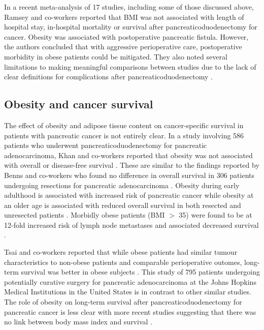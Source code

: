 In a recent meta-analysis of 17 studies, including some of those discussed above, Ramsey and co-workers reported that BMI was not associated with length of hospital stay, in-hospital mortality or survival after pancreaticoduodenectomy for cancer. 
Obesity was associated with postoperative pancreatic fistula. 
However, the authors concluded that with aggressive perioperative care, postoperative morbidity in obese patients could be mitigated. 
They also noted several limitations to making meaningful comparisons between studies due to the lack of clear definitions for complications after pancreaticoduodenectomy \parencite{ramsey_body_2011}.

\subsection{Obesity and cancer survival}

The effect of obesity and adipose tissue content on cancer-specific survival in patients with pancreatic cancer is not entirely clear. 
In a study involving 586 patients who underwent pancreaticoduodenectomy for pancreatic adenocarcinoma, Khan and co-workers reported that obesity was not associated with overall or disease-free survival \parencite{khan_does_2010}. 
These are similar to the findings reported by Benns and co-workers who found no difference in overall survival in 306 patients undergoing resections for pancreatic adenocarcinoma \parencite{benns_impact_2009}. 
Obesity during early adulthood is associated with increased risk of pancreatic cancer while obesity at an older age is associated with reduced overall survival in both resected and unresected patients \parencite{li_body_2009}. 
Morbidly obese patients (BMI $>$ 35) were found to be at 12-fold increased risk of lymph node metastases and associated decreased survival \parencite{fleming_influence_2009}.

Tsai and co-workers reported that while obese patients had similar tumour characteristics to non-obese patients and comparable perioperative outomes, long-term survival was better in obese subjects \parencite{tsai_impact_2010}. 
This study of 795 patients undergoing potentially curative surgery for pancreatic adenocarcinoma at the Johns Hopkins Medical Institutions in the United States is in contrast to other similar studies. 
The role of obesity on long-term survival after pancreaticoduodenectomy for pancreatic cancer is less clear with more recent studies suggesting that there was no link between body mass index and survival \parencite{dandona_influence_2011, benns_impact_2009}.

